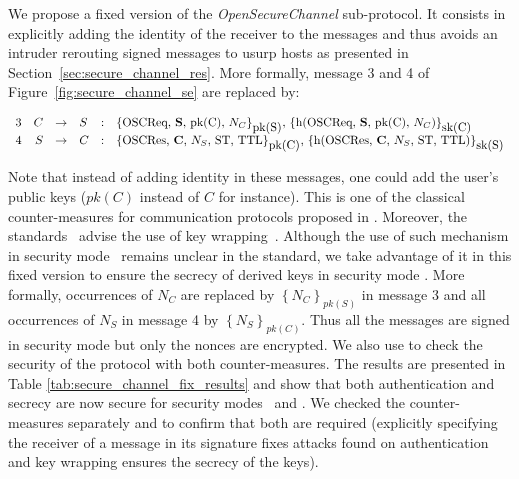 We propose a fixed version of the {\em OpenSecureChannel} sub-protocol.
It consists in explicitly adding the identity of the receiver to the messages
and thus  avoids an intruder rerouting signed messages to usurp hosts as
presented in Section~\ref{sec:secure_channel_res}.
More formally, message 3 and 4 of Figure~\ref{fig:secure_channel_se} are replaced
by:
\arraycolsep=1.4pt
{\small
\begin{flushleft}
    $\begin{array}{lrllll}
        3 & C & \rightarrow & S & : & \text{\sm{\oscreq, {\bf S}, pk(C), $N_{C}$}{pk(S)}{sk(C)}}\\
        4 & S & \rightarrow & C & : & \text{\sm{\oscres, {\bf C}, $N_{S}$, ST, TTL}{pk(C)}{sk(S)}}\\
    \end{array}$
\end{flushleft}
}

Note that instead of adding identity in these messages, one could add the user's
public keys ($pk(C)$ instead of $C$ for instance).
This is one of the classical counter-measures for communication protocols
proposed in \cite{AN96}.
Moreover, the \opcua{} standards~\cite{MLD09,opcua_part2,opcua_part4,opcua_part6}
advise the use of key wrapping~\cite{FLS11}.
Although the use of such mechanism in security mode \sms~remains unclear in the
standard, we take advantage of it in this fixed version to ensure the secrecy of
derived keys in security mode \sms.
More formally, occurrences of $N_{C}$ are replaced by
$\left\{\mbox{$N_{C}$}\right\}_{pk(S)}$ in message 3 and all occurrences of
$N_{S}$ in message 4 by $\left\{\mbox{$N_{S}$}\right\}_{pk(C)}$.
Thus all the messages are signed in security mode \sms{} but only the nonces are
encrypted.
We also use \proverif to check the security of the protocol with both
counter-measures.
The results are presented in Table \ref{tab:secure_channel_fix_results} and
show that both authentication and secrecy are now secure for security modes
\sms~and \smse.
We checked the counter-measures separately and to confirm that both are
required (explicitly specifying the receiver of a message in its signature fixes
attacks found on authentication and key wrapping ensures the secrecy of the keys).

